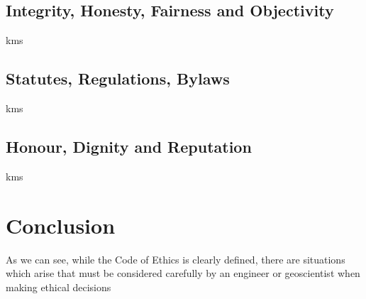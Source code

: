 \documentclass[letterpaper,12pt]{article}
\begin{document}
\subsection{Integrity, Honesty, Fairness and Objectivity}
kms

\subsection{Statutes, Regulations, Bylaws}
kms

\subsection{Honour, Dignity and Reputation}
kms

\section{Conclusion}
As we can see, while the Code of Ethics is clearly defined, there are situations which arise that must be considered carefully by an engineer or
geoscientist when making ethical decisions


\singlespacing
\nocite{*}
\printbibliography
\end{document}
